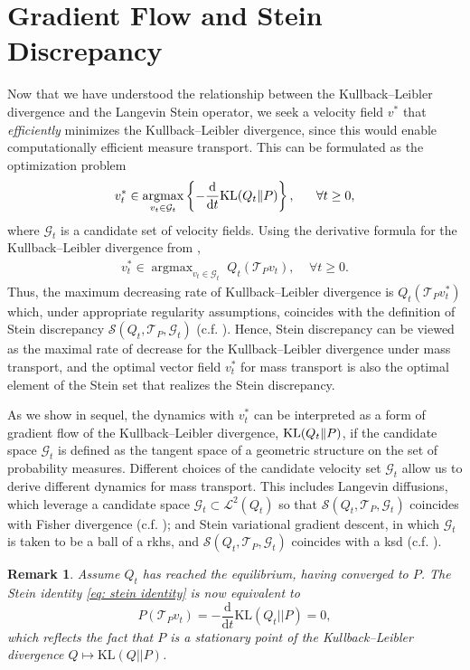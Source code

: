 \documentclass[12pt,paper=letter]{scrreprt}
\newtheorem{remark}{Remark}[chapter]
\newcommand{\dno}{\mathrm{d}}
\newcommand{\ddt}{\frac{\dno}{\dno t}}
\def\KL#1#2{\textnormal{KL}({#1}\Vert{#2})}
\providecommand{\argmax}{\mathop\mathrm{arg max}} %
\newcommand{\KLL}{\mathrm{KL}}
\begin{document}
\section{Gradient Flow and Stein Discrepancy}  

Now that we have understood the relationship between the Kullback--Leibler divergence and the Langevin Stein operator, we seek a velocity field $v^*$ that \emph{efficiently} minimizes the Kullback--Leibler divergence, since this would enable computationally efficient measure transport. 
This can be formulated as the optimization problem
$$
v_t^* \in \argmax_{v_t \in \mathcal{G}_t} \left\{ - \ddt \KL{Q_t}{P}  \right\} , ~~~~~\forall t\geq0 ,
$$
where $\mathcal{G}_t$ is a candidate set of velocity fields. 
Using the derivative formula for the Kullback--Leibler divergence from , 
\begin{align}
v_t^* \in \argmax_{v_t \in \mathcal{G}_t} \; Q_t(\mathcal{T}_P v_t)  , ~~~~~\forall t\geq0 .  \label{eq: max of SD}
\end{align}
Thus, the maximum decreasing rate of Kullback--Leibler divergence is $Q_t(\mathcal{T}_P v_t^*)$ which, under appropriate regularity assumptions, coincides with the definition of Stein discrepancy $\mathcal{S}(Q_t , \mathcal{T}_P , \mathcal{G}_t)$ (c.f. ). 
Hence, Stein discrepancy can be viewed as the maximal rate of decrease for the Kullback--Leibler divergence under mass transport, and the optimal vector field $v_t^*$ for mass transport is also the optimal element of the Stein set that realizes the Stein discrepancy. 

As we show in sequel, the dynamics with $v_t^*$ can be interpreted as a form of gradient flow of the Kullback--Leibler divergence, $\KL{Q_t}{P}$, if the candidate space $\mathcal{G}_t$ is defined as the tangent space of a geometric structure on the set of probability measures.  
Different choices of the candidate velocity set $\mathcal{G}_t$ allow us to derive different dynamics for mass transport. 
This includes Langevin diffusions, which leverage a candidate space $\mathcal{G}_t \subset \mathcal{L}^2(Q_t)$ so that  
$\mathcal{S}(Q_t , \mathcal{T}_P , \mathcal{G}_t)$ coincides with Fisher divergence (c.f. ); 
and Stein variational gradient descent, in which $\mathcal{G}_t$ is taken to be a ball of a \acf{rkhs}, and $\mathcal{S}(Q_t , \mathcal{T}_P , \mathcal{G}_t)$ coincides with a \acf{ksd} (c.f. ). 

\begin{remark}
Assume $Q_t$ has reached the equilibrium, having converged to $P$. 
The Stein identity \eqref{eq: stein identity} is now equivalent to 
$$
P(\mathcal T_P v_t)  =-\frac{\dno }{\dno t} \KLL(Q_t || P)  
= 0, $$ 
which reflects the fact that $P$ is a stationary point of the Kullback--Leibler divergence $Q \mapsto \KLL( Q  || P)$. 
\end{remark}
\end{document}

